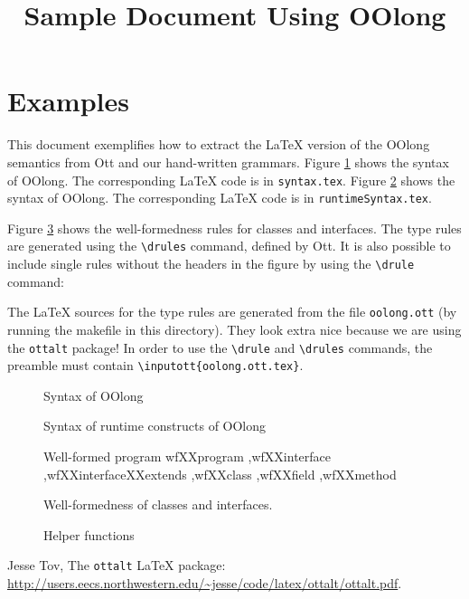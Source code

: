 \documentclass{article}
\title{Sample Document Using OOlong}
\renewcommand{\c}[1]{\texttt{#1}}
\begin{document}
\maketitle

\section{Examples}

This document exemplifies how to extract the \LaTeX{} version of
the OOlong semantics from Ott and our hand-written grammars.
Figure \ref{fig:syntax} shows the syntax of OOlong. The
corresponding \LaTeX{} code is in \texttt{syntax.tex}. Figure
\ref{fig:runtime_syntax} shows the syntax of OOlong. The
corresponding \LaTeX{} code is in \texttt{runtimeSyntax.tex}.

Figure \ref{fig:wf_program} shows the well-formedness rules for
classes and interfaces. The type rules are generated using the
\c{\textbackslash drules} command, defined by Ott. It is also
possible to include single rules without the headers in the
figure by using the \c{\textbackslash drule} command:\medskip

\medskip

The \LaTeX{} sources for the type rules are generated from the
file \c{oolong.ott} (by running the makefile in this directory).
They look extra nice because we are using the \c{ottalt}
package\cite{ottalt}! In order to use the \c{\textbackslash drule}
and \c{\textbackslash drules} commands, the preamble must contain
\c{\textbackslash inputott\{oolong.ott.tex\}}.

\begin{figure}
  \centering
  
  \caption{Syntax of OOlong }
  \label{fig:syntax}
\end{figure}

\begin{figure}
  \centering
  
  \caption{Syntax of runtime constructs of OOlong}
  \label{fig:runtime_syntax}
\end{figure}

\begin{figure}
         {Well-formed program}
         {wfXXprogram
         ,wfXXinterface
         ,wfXXinterfaceXXextends
         ,wfXXclass
         ,wfXXfield
         ,wfXXmethod
       }
\caption{Well-formedness of classes and interfaces. }
  \label{fig:wf_program}
\end{figure}

\begin{figure}
  
  \caption{Helper functions}
  \label{fig:helpers}
\end{figure}

\begin{thebibliography}{}

  Jesse Tov,
  The \c{ottalt} \LaTeX{} package:\\
  \url{http://users.eecs.northwestern.edu/~jesse/code/latex/ottalt/ottalt.pdf}.

\end{thebibliography}
\end{document}
